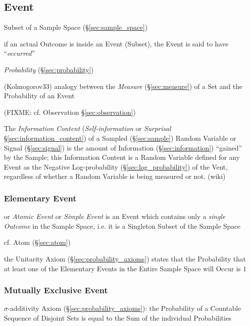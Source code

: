 \subsection{Event}\label{sec:probability_event}

Subset of a Sample Space (\S\ref{sec:sample_space})

if an actual Outcome is inside an Event (Subset), the Event is said to have
``\emph{occurred}''

\emph{Probability} (\S\ref{sec:probability})

(Kolmogorov33) analogy between the \emph{Measure} (\S\ref{sec:measure}) of a Set
and the Probability of an Event

(FIXME: cf. Observation \S\ref{sec:observation})

The \emph{Information Content} (\emph{Self-information} or \emph{Surprisal}
\S\ref{sec:information_content}) of a Sampled (\S\ref{sec:sample}) Random
Variable or Signal (\S\ref{sec:signal}) is the amount of Information
(\S\ref{sec:information}) ``gained'' by the Sample; this Information Content is
a Random Variable defined for any Event as the Negative Log-probability
(\S\ref{sec:log_probability}) of the Vent, regardless of whether a Random
Variable is being measured or not. (wiki)



\subsubsection{Elementary Event}\label{sec:elementary_event}

or \emph{Atomic Event} or \emph{Simple Event} is an Event which contains only a
\emph{single Outcome} in the Sample Space, i.e. it is a Singleton Subset of the
Sample Space

cf. Atom (\S\ref{sec:atom})

the Unitarity Axiom (\S\ref{sec:probability_axioms}) states that the
Probability that at least one of the Elementary Events in the Entire Sample
Space will Occur is $1$



\subsubsection{Mutually Exclusive Event}\label{sec:mutually_exclusive}

$\sigma$-additivity Axiom (\S\ref{sec:probability_axioms}): the Probability of
a Countable Sequence of Disjoint Sets is equal to the Sum of the individual
Probabilities

